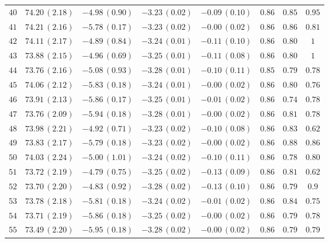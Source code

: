 \begin{center}
\begin{longtable}{@{\extracolsep{\fill}}cccccccc@{}}
$ 40 $ & $74.20\,(2.18)$ & $-4.98\,(0.90)$ & $-3.23\,(0.02)$ & $-0.09\,(0.10) $ & $0.86 $ & $ 0.85$ & $ 0.95 $\\
$ 41 $ & $74.21\,(2.16)$ & $-5.78\,(0.17)$ & $-3.23\,(0.02)$ & $-0.00\,(0.02) $ & $0.86 $ & $ 0.86$ & $ 0.81 $\\
$ 42 $ & $74.11\,(2.17)$ & $-4.89\,(0.84)$ & $-3.24\,(0.01)$ & $-0.11\,(0.10) $ & $0.86 $ & $ 0.80$ & $ 1$\\
$ 43 $ & $73.88\,(2.15)$ & $-4.96\,(0.69)$ & $-3.25\,(0.01)$ & $-0.11\,(0.08) $ & $0.86 $ & $ 0.80 $ & $1 $\\
$ 44 $ & $73.76\,(2.16)$ & $-5.08\,(0.93)$ & $-3.28\,(0.01)$ & $-0.10\,(0.11) $ & $0.85 $ & $ 0.79$ & $ 0.78 $\\
$ 45 $ & $74.06\,(2.12)$ & $-5.83\,(0.18)$ & $-3.24\,(0.01)$ & $-0.00\,(0.02) $ & $0.86 $ & $ 0.80$ & $ 0.76 $\\
$ 46 $ & $73.91\,(2.13)$ & $-5.86\,(0.17)$ & $-3.25\,(0.01)$ & $-0.01\,(0.02) $ & $0.86 $ & $ 0.74$ & $ 0.78$\\
$ 47 $ & $73.76\,(2.09)$ & $-5.94\,(0.18)$ & $-3.28\,(0.01)$ & $-0.00\,(0.02) $ & $ 0.86 $ & $0.81 $ & $ 0.78$\\
$ 48 $ & $73.98\,(2.21)$ & $-4.92\,(0.71)$ & $-3.23\,(0.02)$ & $-0.10\,(0.08) $ & $0.86 $ & $0.83 $ & $ 0.62 $\\
$ 49 $ & $73.83\,(2.17)$ & $-5.79\,(0.18)$ & $-3.23\,(0.02)$ & $-0.00\,(0.02) $ & $ 0.86$ & $0.88 $ & $ 0.86 $\\
$ 50 $ & $74.03\,(2.24)$ & $-5.00\,(1.01)$ & $-3.24\,(0.02)$ & $-0.10\,(0.11) $ & $0.86 $ & $0.78 $ & $0.80 $\\
$ 51 $ & $73.72\,(2.19)$ & $-4.79\,(0.75)$ & $-3.25\,(0.02)$ & $-0.13\,(0.09) $ & $ 0.86$ & $0.81 $ & $ 0.62 $\\
$ 52 $ & $73.70\,(2.20)$ & $-4.83\,(0.92)$ & $-3.28\,(0.02)$ & $-0.13\,(0.10) $ & $ 0.86$ & $0.79 $ & $ 0.9$\\
$ 53 $ & $73.78\,(2.18)$ & $-5.81\,(0.18)$ & $-3.24\,(0.02)$ & $-0.01\,(0.02) $ & $ 0.86$ & $ 0.84$ & $ 0.75$\\
$ 54 $ & $73.71\,(2.19)$ & $-5.86\,(0.18)$ & $-3.25\,(0.02)$ & $-0.00\,(0.02) $ & $0.86 $ & $ 0.79 $ & $ 0.78 $\\
$ 55 $ & $73.49\,(2.20)$ & $-5.95\,(0.18)$ & $-3.28\,(0.02)$ & $-0.00\,(0.02) $ & $0.86 $ & $0.79 $ & $ 0.79$\\

\end{longtable}
\normalsize
\end{center}

